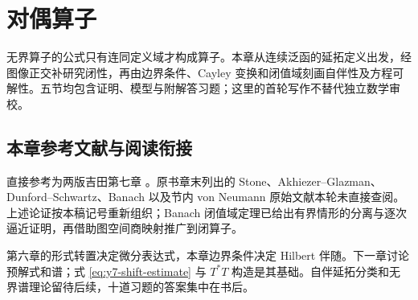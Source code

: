 \chapter{对偶算子}\label{ch:yosida-07}

无界算子的公式只有连同定义域才构成算子。本章从连续泛函的延拓定义出发，经图像正交补研究闭性，再由边界条件、Cayley 变换和闭值域刻画自伴性及方程可解性。五节均包含证明、模型与附解答习题；这里的首轮写作不替代独立数学审校。







\section*{本章参考文献与阅读衔接}
直接参考为两版吉田第七章 \cite{yosida-zh,yosida-en}。原书章末列出的 Stone、Akhiezer--Glazman、Dunford--Schwartz、Banach 以及节内 von Neumann 原始文献本轮未直接查阅。上述论证按本稿记号重新组织；Banach 闭值域定理已给出有界情形的分离与逐次逼近证明，再借助图空间商映射推广到闭算子。

第六章的形式转置决定微分表达式，本章边界条件决定 Hilbert 伴随。下一章讨论预解式和谱；式 \eqref{eq:y7-shift-estimate} 与 $T^*T$ 构造是其基础。自伴延拓分类和无界谱理论留待后续，十道习题的答案集中在书后。
